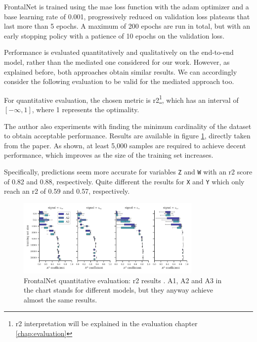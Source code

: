 FrontalNet is trained using the \gls{mae} loss function with the \gls{adam} optimizer \cite{kingma2014adam} and a base learning rate of 0.001, progressively reduced on validation loss plateaus that last more than 5 epochs. A maximum of 200 epochs are run in total, but with an early stopping policy with a patience of 10 epochs on the validation loss. 

Performance is evaluated quantitatively and qualitatively on the end-to-end model, rather than the mediated one considered for our work. However, as explained before, both approaches obtain similar results. We can accordingly consider the following evaluation to be valid for the mediated approach too.

\medskip 

For quantitative evaluation, the chosen metric is \gls{r2}\footnote{\gls{r2} interpretation will be explained in the evaluation chapter \ref{chap:evaluation}}, which has an interval of $[-\infty, 1]$, where 1 represents the optimality. 

The author also experiments with finding the minimum cardinality of the dataset to obtain acceptable performance. Results are available in figure \ref{fig:frontalnet-r2}, directly taken from the paper. As shown, at least 5,000 samples are required to achieve decent performance, which improves as the size of the training set increases.

Specifically, predictions seem more accurate for variables \texttt{Z} and \texttt{W} with an \gls{r2} score of 0.82 and 0.88, respectively. Quite different the results for \texttt{X} and \texttt{Y} which only reach an \gls{r2} of 0.59 and 0.57, respectively.

\begin{figure}[!htb]
	\centering
	\includegraphics[width=0.8\textwidth]{"contents/images/03-frontalnet-r2"}
	\caption[FrontalNet quantitative evaluation: \gls{r2} results \cite{mantegazza2019visionbased}]{FrontalNet quantitative evaluation: \gls{r2} results \cite{mantegazza2019visionbased}. A1, A2 and A3 in the chart stands for different models, but they anyway achieve almost the same results.}
	\label{fig:frontalnet-r2}
\end{figure}

